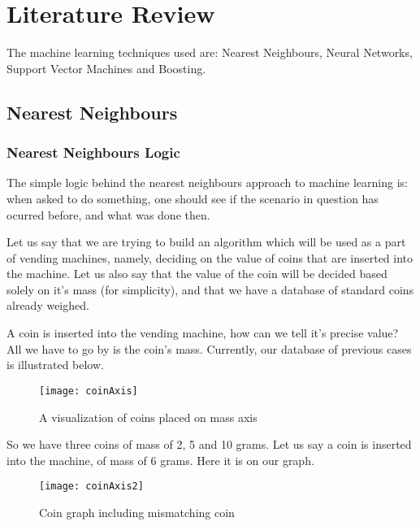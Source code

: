 \documentclass[a4paper, 12pt]{article}
\begin{document}
    \section{Literature Review}

        \par The machine learning techniques used are: Nearest Neighbours, Neural Networks, Support Vector Machines and Boosting.

        \subsection{Nearest Neighbours}

            \subsubsection{Nearest Neighbours Logic}

                \par The simple logic behind the nearest neighbours approach to machine learning is: when asked to do something, one should see if the scenario in question has ocurred before, and what was done then.

                \par Let us say that we are trying to build an algorithm which will be used as a part of vending machines, namely, deciding on the value of coins that are inserted into the machine. Let us also say that the value of the coin will be decided based solely on it's mass (for simplicity), and that we have a database of standard coins already weighed.

                \par A coin is inserted into the vending machine, how can we tell it's precise value? All we have to go by is the coin's mass. Currently, our database of previous cases is illustrated below.

                \begin{figure}[h]
                    \caption{A visualization of coins placed on mass axis}
                    \centering
                    \texttt{[image: coinAxis]}
                \end{figure}

                \par So we have three coins of mass of 2, 5 and 10 grams. Let us say a coin is inserted into the machine, of mass of 6 grams. Here it is on our graph.

                \begin{figure}[h]
                    \caption{Coin graph including mismatching coin}
                    \centering
                    \texttt{[image: coinAxis2]}
                \end{figure}
\end{document}
